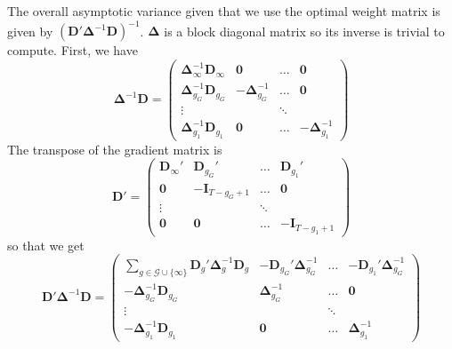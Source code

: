 The overall asymptotic variance given that we use the optimal weight matrix is given by $(\bm D' \bm \Delta^{-1} \bm D)^{-1}$. $\bm\Delta$ is a block diagonal matrix so its inverse is trivial to compute. First, we have
\begin{equation*}
    \bm \Delta^{-1} \bm D = 
    \begin{pmatrix}
        \bm \Delta_{\infty}^{-1} \bm D_{\infty} & \bm 0 &  \hdots & \bm 0\\
        \bm \Delta_{g_G}^{-1} \bm D_{g_G} & -\bm \Delta_{g_G}^{-1} & \hdots & \bm 0\\
        \vdots & & \ddots &\\
        \bm \Delta_{g_1}^{-1} \bm D_{g_1} & \bm 0 & \hdots & - \bm \Delta_{g_1}^{-1}
    \end{pmatrix}
\end{equation*}
The transpose of the gradient matrix is
\begin{equation*}
    \bm D' =
    \begin{pmatrix}
        \bm D_{\infty}' & \bm D_{g_G}' & \hdots & \bm D_{g_1}'\\
        \bm 0 & -\bm I_{T-g_G + 1} & \hdots & \bm 0\\
        \vdots & & \ddots & \\
        \bm 0 & \bm 0 & \hdots & - \bm I_{T-g_1 + 1}
    \end{pmatrix}
\end{equation*}
so that we get
\begin{equation*}
    \bm D' \bm \Delta^{-1} \bm D = 
    \begin{pmatrix}
        \sum_{g \in \mathcal{G}\cup\{\infty\}} \bm D_g' \bm \Delta_g^{-1} \bm D_g & -\bm D_{g_G}' \bm \Delta_{g_G}^{-1} & \hdots & - \bm D_{g_1}' \bm \Delta_{g_G}^{-1}\\
        -\bm \Delta_{g_G}^{-1} \bm D_{g_G} & \bm \Delta_{g_G}^{-1} & \hdots & \bm 0\\
        \vdots & & \ddots &\\
        -\bm \Delta_{g_1}^{-1} \bm D_{g_1} & \bm 0 & \hdots & \bm \Delta_{g_1}^{-1}
    \end{pmatrix}
\end{equation*}

